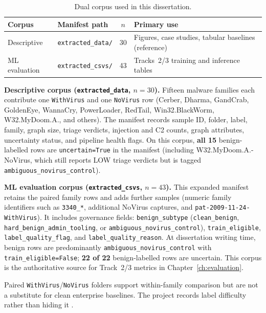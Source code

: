 \begin{table}[htbp]
\centering
\caption{Dual corpus used in this dissertation.}
\label{tab:dual_corpus}
\small
\begin{tabular}{p{2.4cm}p{3.2cm}cp{4.8cm}}
\toprule
\textbf{Corpus} & \textbf{Manifest path} & \textbf{$n$} & \textbf{Primary use} \\
\midrule
Descriptive & \texttt{extracted\_data/} & 30 & Figures, case studies, tabular baselines (reference) \\
ML evaluation & \texttt{extracted\_csvs/} & 43 & Tracks~2/3 training and inference tables \\
\bottomrule
\end{tabular}
\end{table}

\textbf{Descriptive corpus (\texttt{extracted\_data}, $n{=}30$).}
Fifteen malware families each contribute one \texttt{WithVirus} and one \texttt{NoVirus} row (Cerber, Dharma, GandCrab, GoldenEye, WannaCry, PowerLoader, RedTail, Win32.BlackWorm, W32.MyDoom.A., and others). The manifest records sample ID, folder, label, family, graph size, triage verdicts, injection and C2 counts, graph attributes, uncertainty status, and pipeline health flags. On this corpus, \textbf{all 15} benign-labelled rows are \texttt{uncertain=True} in the manifest (including W32.MyDoom.A.-NoVirus, which still reports LOW triage verdicts but is tagged \texttt{ambiguous\_novirus\_control}).

\textbf{ML evaluation corpus (\texttt{extracted\_csvs}, $n{=}43$).}
This expanded manifest retains the paired family rows and adds further samples (numeric family identifiers such as \texttt{3340\_*}, additional NoVirus captures, and \texttt{pat-2009-11-24-WithVirus}). It includes governance fields: \texttt{benign\_subtype} (\texttt{clean\_benign}, \texttt{hard\_benign\_admin\_tooling}, or \texttt{ambiguous\_novirus\_control}), \texttt{train\_eligible}, \texttt{label\_quality\_flag}, and \texttt{label\_quality\_reason}. At dissertation writing time, benign rows are predominantly \texttt{ambiguous\_novirus\_control} with \texttt{train\_eligible=False}; \textbf{22 of 22} benign-labelled rows are uncertain. This corpus is the authoritative source for Track~2/3 metrics in Chapter~\ref{ch:evaluation}.

Paired \texttt{WithVirus}/\texttt{NoVirus} folders support within-family comparison but are not a substitute for clean enterprise baselines. The project records label difficulty rather than hiding it \cite{goodman2016reproducibility}.

